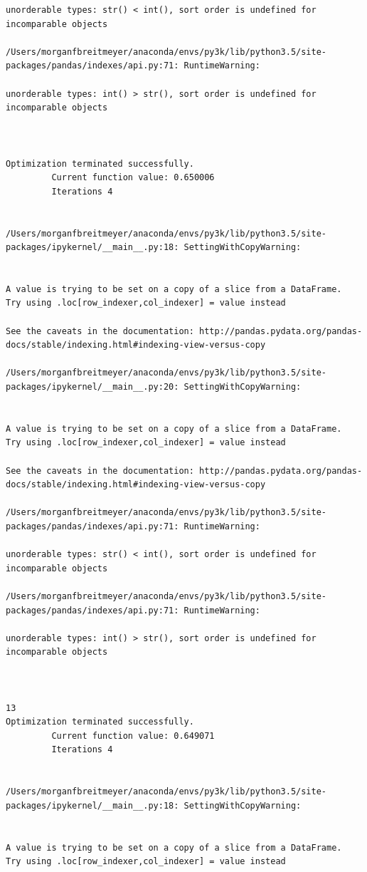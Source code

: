 \begin{lstlisting}
unorderable types: str() < int(), sort order is undefined for incomparable objects

/Users/morganfbreitmeyer/anaconda/envs/py3k/lib/python3.5/site-packages/pandas/indexes/api.py:71: RuntimeWarning:

unorderable types: int() > str(), sort order is undefined for incomparable objects



Optimization terminated successfully.
         Current function value: 0.650006
         Iterations 4


/Users/morganfbreitmeyer/anaconda/envs/py3k/lib/python3.5/site-packages/ipykernel/__main__.py:18: SettingWithCopyWarning:


A value is trying to be set on a copy of a slice from a DataFrame.
Try using .loc[row_indexer,col_indexer] = value instead

See the caveats in the documentation: http://pandas.pydata.org/pandas-docs/stable/indexing.html#indexing-view-versus-copy

/Users/morganfbreitmeyer/anaconda/envs/py3k/lib/python3.5/site-packages/ipykernel/__main__.py:20: SettingWithCopyWarning:


A value is trying to be set on a copy of a slice from a DataFrame.
Try using .loc[row_indexer,col_indexer] = value instead

See the caveats in the documentation: http://pandas.pydata.org/pandas-docs/stable/indexing.html#indexing-view-versus-copy

/Users/morganfbreitmeyer/anaconda/envs/py3k/lib/python3.5/site-packages/pandas/indexes/api.py:71: RuntimeWarning:

unorderable types: str() < int(), sort order is undefined for incomparable objects

/Users/morganfbreitmeyer/anaconda/envs/py3k/lib/python3.5/site-packages/pandas/indexes/api.py:71: RuntimeWarning:

unorderable types: int() > str(), sort order is undefined for incomparable objects



13
Optimization terminated successfully.
         Current function value: 0.649071
         Iterations 4


/Users/morganfbreitmeyer/anaconda/envs/py3k/lib/python3.5/site-packages/ipykernel/__main__.py:18: SettingWithCopyWarning:


A value is trying to be set on a copy of a slice from a DataFrame.
Try using .loc[row_indexer,col_indexer] = value instead


\end{lstlisting}

